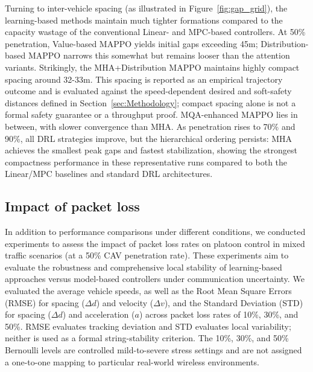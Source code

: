 \documentclass{ieeeaccess}
\begin{document}
Turning to inter-vehicle spacing (as illustrated in Figure~\ref{fig:gap_grid}), the learning-based methods maintain much tighter formations compared to the capacity wastage of the conventional Linear- and MPC-based controllers. At 50\% penetration, Value-based MAPPO yields initial gaps exceeding 45m; Distribution-based MAPPO narrows this somewhat but remains looser than the attention variants. Strikingly, the MHA+Distribution MAPPO maintains highly compact spacing around 32-33m. This spacing is reported as an empirical trajectory outcome and is evaluated against the speed-dependent desired and soft-safety distances defined in Section~\ref{sec:Methodology}; compact spacing alone is not a formal safety guarantee or a throughput proof. MQA-enhanced MAPPO lies in between, with slower convergence than MHA. As penetration rises to 70\% and 90\%, all DRL strategies improve, but the hierarchical ordering persists: MHA achieves the smallest peak gaps and fastest stabilization, showing the strongest compactness performance in these representative runs compared to both the Linear/MPC baselines and standard DRL architectures.


\subsection{Impact of packet loss}
\label{sec:impact_packet_loss}

In addition to performance comparisons under different conditions, we conducted experiments to assess the impact of packet loss rates on platoon control in mixed traffic scenarios (at a 50\% CAV penetration rate). These experiments aim to evaluate the robustness and comprehensive local stability of learning-based approaches versus model-based controllers under communication uncertainty. We evaluated the average vehicle speeds, as well as the Root Mean Square Errors (RMSE) for spacing ($\Delta d$) and velocity ($\Delta v$),  and the Standard Deviation (STD) for spacing ($\Delta d$) and acceleration ($a$) across packet loss rates of 10\%, 30\%, and 50\%. RMSE evaluates tracking deviation and STD evaluates local variability; neither is used as a formal string-stability criterion. The 10\%, 30\%, and 50\% Bernoulli levels are controlled mild-to-severe stress settings and are not assigned a one-to-one mapping to particular real-world wireless environments.
\end{document}
